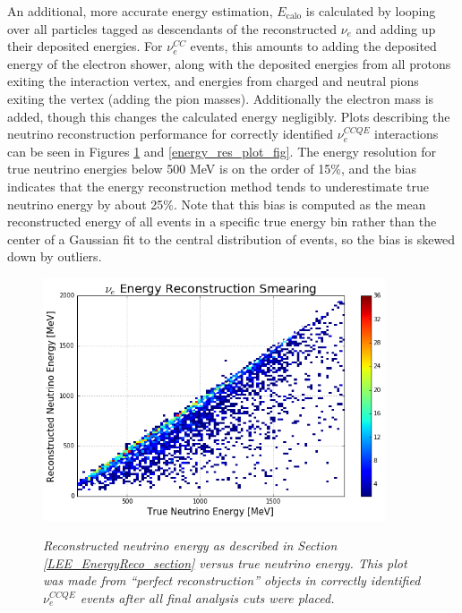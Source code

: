 An additional, more accurate energy estimation, $E_{\text{calo}}$ is calculated by looping over all particles tagged as descendants of the reconstructed $\nu_e$ and adding up their deposited energies. For $\nu_e^{CC}$ events, this amounts to adding the deposited energy of the electron shower, along with the deposited energies from all protons exiting the interaction vertex, and energies from charged and neutral pions exiting the vertex (adding the pion masses). Additionally the electron mass is added, though this changes the calculated energy negligibly. Plots describing the neutrino reconstruction performance for correctly identified $\nu_e^{CCQE}$ interactions can be seen in Figures \ref{energy_smear_plot_fig} and \ref{energy_res_plot_fig}. The energy resolution for true neutrino energies below 500 MeV is on the order of 15\%, and the bias indicates that the energy reconstruction method tends to underestimate true neutrino energy by about 25\%. Note that this bias is computed as the mean reconstructed energy of all events in a specific true energy bin rather than the center of a Gaussian fit to the central distribution of events, so the bias is skewed down by outliers.

\begin{figure}[ht!]
\centering
\includegraphics[width=0.9\textwidth]{Figures/LEE_EnergySmear_WithAnalysisCuts.png}\\%
\caption{\textit{Reconstructed neutrino energy as described in Section \ref{LEE_EnergyReco_section} versus true neutrino energy. This plot was made from ``perfect reconstruction'' objects in correctly identified $\nu_e^{CCQE}$ events after all final analysis cuts were placed.}}
\label{energy_smear_plot_fig}
\end{figure}

